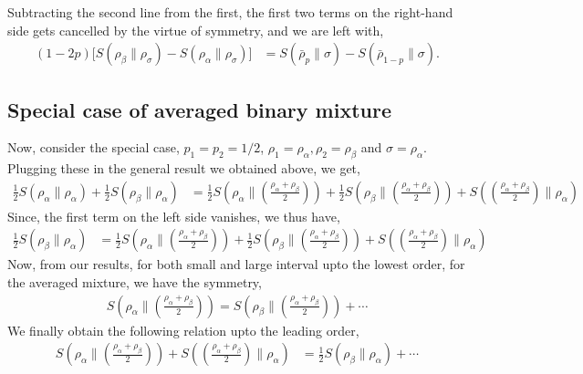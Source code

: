 \documentclass[11pt]{article}
\newcommand{\lb}{\left(}
\newcommand{\rb}{\right)}
\begin{document}
Subtracting the second line from the first, the first two terms on the right-hand side gets cancelled by the virtue of symmetry, and we are left with,
\begin{align}
    (1-2p) \Big[S (\rho_\beta\| \rho_\sigma)  - S (\rho_\alpha\| \rho_\sigma)\Big] &= S(\bar{\rho}_p \|\sigma) - S(\bar{\rho}_{1-p} \| \sigma).
\end{align}
\subsection{Special case of averaged binary mixture}
Now, consider the special case, $p_1 = p_2 =1/2$, $\rho_1 = \rho_\alpha, \rho_2 = \rho_\beta$ and $\sigma = \rho_\alpha$.
Plugging these in the general result we obtained above, we get,
\begin{align}
    \frac{1}{2}S(\rho_\alpha \| \rho_\alpha) + \frac{1}{2}S(\rho_\beta \| \rho_\alpha)  &= \frac{1}{2}S\lb \rho_\alpha \Big\| \lb\frac{\rho_\alpha + \rho_\beta}{2}\rb\rb + \frac{1}{2}S\lb \rho_\beta \Big\| \lb\frac{\rho_\alpha + \rho_\beta}{2}\rb\rb + S\lb \lb\frac{\rho_\alpha + \rho_\beta}{2}\rb \Big\| \rho_\alpha\rb
    \end{align}
Since, the first term on the left side vanishes, we thus have,
\begin{align}
    \frac{1}{2}S(\rho_\beta \| \rho_\alpha)  &=\frac{1}{2}S\lb \rho_\alpha \Big\| \lb\frac{\rho_\alpha + \rho_\beta}{2}\rb\rb + \frac{1}{2}S\lb \rho_\beta \Big\| \lb\frac{\rho_\alpha + \rho_\beta}{2}\rb\rb + S\lb \lb\frac{\rho_\alpha + \rho_\beta}{2}\rb \Big\| \rho_\alpha\rb
\end{align}
Now, from our results, for both small and large interval upto the lowest order, for the averaged mixture, we have the symmetry,
\begin{align}
    S\lb \rho_\alpha \Big\| \lb\frac{\rho_\alpha + \rho_\beta}{2}\rb\rb = S\lb \rho_\beta \Big\| \lb\frac{\rho_\alpha + \rho_\beta}{2}\rb\rb + \cdots
\end{align}
We finally obtain the following relation upto the leading order,
\begin{align}
    S\lb \rho_\alpha \Big\| \lb\frac{\rho_\alpha + \rho_\beta}{2}\rb\rb + S\lb \lb\frac{\rho_\alpha + \rho_\beta}{2}\rb \Big\| \rho_\alpha\rb  &= \frac{1}{2} S(\rho_\beta \| \rho_\alpha)+\cdots
\end{align}
\end{document}
